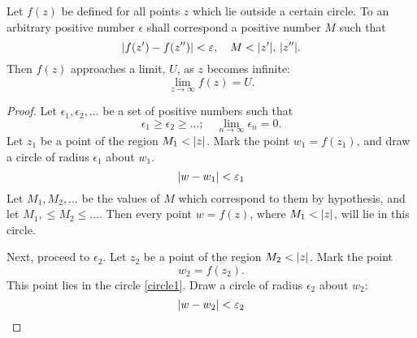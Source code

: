 \documentclass[twosided]{memoir}
\begin{document}
\begin{theorem}
	Let $f(z)$ be defined for all points $z$ which lie outside a certain circle. To an arbitrary positive number $\epsilon$ shall correspond a positive number $M$ such that
	\[
		\abs*{f(z')-f(z'')} <\epsilon, \quad M<\abs*{z'} , \, \abs*{z''} 
	.\] Then $f(z)$ approaches a limit, $U$, as $z$ becomes infinite:
	\[
		\lim\limits_{z\to \infty} f(z)=U
	.\] 
\end{theorem} 
\begin{proof}
Let $\epsilon_1, \epsilon_2, \dots $ be a set of positive numbers such that
\[
\epsilon_1\ge \epsilon_2\ge \dots ; \quad \lim\limits_{n \to \infty} \epsilon_n=0
.\] Let $z_1$ be a point of the region $M_1<\abs*{z} $. Mark the point $w_1=f(z_1)$, and draw a circle of radius $\epsilon_1$ about $w_1$. 
\begin{equation}\label{circle1}
\abs*{w-w_1} <\epsilon_1
\end{equation}
Let $M_1, M_2, \dots $ be the values of $M$ which correspond to them by hypothesis, and let $M_1, \le M_2 \le \dots $. Then every point $w=f(z)$, where $M_1<\abs*{z} $, will lie in this circle.

Next, proceed to $\epsilon_2$. Let $z_2$ be a point of the region $M_2<\abs*{z} $. Mark the point
\[
	w_2=f(z_2)
.\] This point lies in the circle \ref{circle1}. Draw a circle of radius $\epsilon_2$ about $w_2$:
\begin{equation}\label{circle2}
\abs*{w-w_2} <\epsilon_2
\end{equation}



\end{proof}
\end{document}
